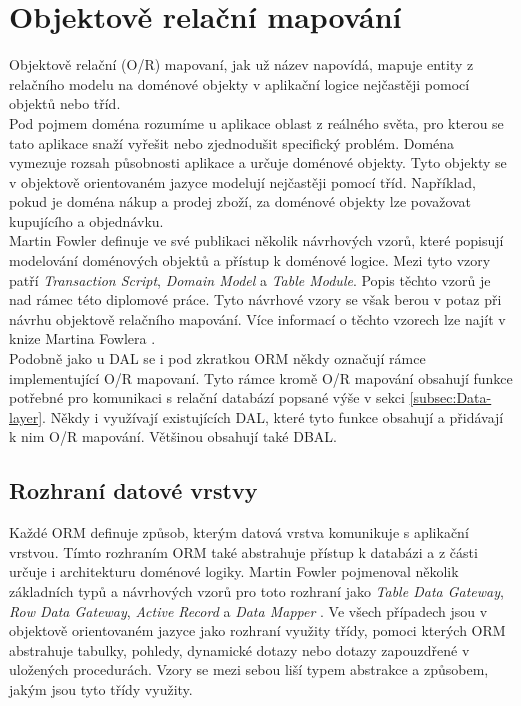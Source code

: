 \documentclass[ing,male,java,dept456]{diploma}						%
\begin{document}

\section{Objektově relační mapování}
\label{sec:ORM}

Objektově relační (O/R) mapovaní, jak už název napovídá, mapuje entity z relačního modelu na doménové objekty v aplikační logice nejčastěji pomocí objektů nebo tříd. \\
Pod pojmem doména rozumíme u aplikace oblast z reálného světa, pro kterou se tato aplikace snaží vyřešit nebo zjednodušit specifický problém. Doména vymezuje rozsah působnosti aplikace a určuje doménové objekty. Tyto objekty se v objektově orientovaném jazyce modelují nejčastěji pomocí tříd. Například, pokud je doména nákup a prodej zboží, za doménové objekty lze považovat kupujícího a objednávku. \\
Martin Fowler definuje ve své publikaci několik návrhových vzorů, které popisují modelování doménových objektů a přístup k doménové logice. Mezi tyto vzory patří \textit{Transaction Script}, \textit{Domain Model} a \textit{Table Module}. Popis těchto vzorů je nad rámec této diplomové práce. Tyto návrhové vzory se však berou v potaz při návrhu objektově relačního mapování. Více informací o těchto vzorech lze najít v knize Martina Fowlera \cite{fowler}.\\
Podobně jako u DAL se i pod zkratkou ORM někdy označují rámce implementující O/R mapovaní. Tyto rámce kromě O/R mapování obsahují funkce potřebné pro komunikaci s relační databází popsané výše v sekci \ref{subsec:Data-layer}. Někdy i využívají existujících DAL, které tyto funkce obsahují a přidávají k nim O/R mapování. Většinou obsahují také DBAL. \\

\subsection{Rozhraní datové vrstvy}

Každé ORM definuje způsob, kterým datová vrstva komunikuje s aplikační vrstvou. Tímto rozhraním ORM také abstrahuje přístup k databázi a z části určuje i architekturu doménové logiky. Martin Fowler pojmenoval několik základních typů a návrhových vzorů pro toto rozhraní jako \textit{Table Data Gateway}, \textit{Row Data Gateway}, \textit{Active Record} a \textit{Data Mapper} \cite{fowler}. Ve všech případech jsou v objektově orientovaném jazyce jako rozhraní využity třídy, pomoci kterých ORM abstrahuje tabulky, pohledy, dynamické 	dotazy nebo dotazy zapouzdřené v uložených procedurách. Vzory se mezi sebou liší typem abstrakce a způsobem, jakým jsou tyto třídy využity.
\end{document}

